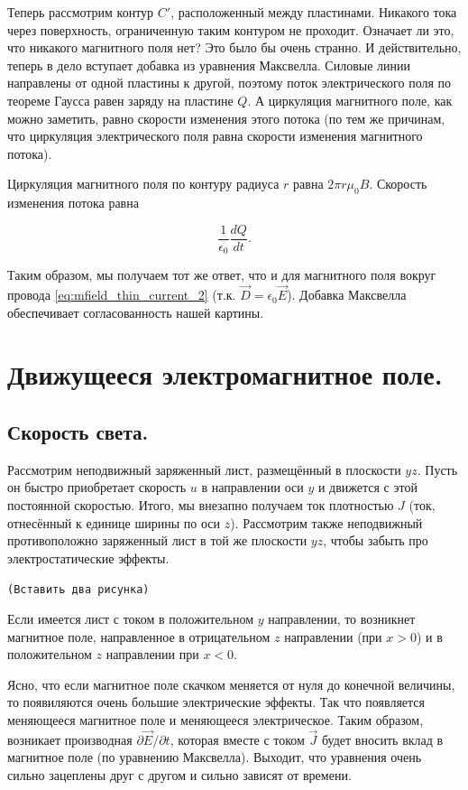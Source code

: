 \documentclass[11pt,a4paper]{article}
\numberwithin{equation}{section}
\newcommand{\pt}{\partial}
\newcommand{\eps}{\epsilon}
\newcommand{\com}[1]{{\Large{\texttt{{\color{red}(#1)}}}}}
\begin{document}
Теперь рассмотрим контур $C'$, расположенный между пластинами. Никакого
тока через поверхность, ограниченную таким контуром не
проходит. Означает ли это, что никакого магнитного поля нет? Это было
бы очень странно. И действительно, теперь в дело вступает добавка из
уравнения Максвелла. Силовые линии направлены от одной пластины к
другой, поэтому поток электрического поля по теореме Гаусса равен
заряду на пластине $Q$. А циркуляция магнитного поле, как можно
заметить, равно скорости изменения этого потока (по тем же причинам,
что циркуляция электрического поля равна скорости изменения магнитного
потока). 

Циркуляция магнитного поля по контуру радиуса $r$ равна $2\pi r
\mu_0 B$. Скорость изменения потока равна 

\begin{equation}
  \label{eq:phys_sense_maxwell_1}
  \frac{1}{\eps_0} \frac{dQ}{dt}.
\end{equation}

Таким образом, мы получаем тот же ответ, что и для магнитного поля
вокруг провода \eqref{eq:mfield_thin_current_2} (т.к. $\vec{D} =
\eps_0 \vec{E}$). Добавка Максвелла обеспечивает согласованность нашей
картины.

\section{Движущееся электромагнитное поле. }
\label{sec:moving_plate}

\subsection{Скорость света.}
\label{sec:speed_of_light}

Рассмотрим неподвижный заряженный лист, размещённый в плоскости
$yz$. Пусть он быстро приобретает скорость $u$ в направлении оси $y$ и
движется с этой постоянной скоростью. Итого, мы внезапно получаем ток
плотностью $J$ (ток, отнесённый к единице ширины по оси
$z$). Рассмотрим также неподвижный противоположно заряженный лист в
той же плоскости $yz$, чтобы забыть про электростатические эффекты.

\com{Вставить два рисунка}

Если имеется лист с током в положительном $y$ направлении, то
возникнет магнитное поле, направленное в отрицательном $z$
направлении (при $x>0$) и в положительном $z$ направлении при $x<0$. 

Ясно, что если магнитное поле скачком меняется от нуля до конечной
величины, то появиляются очень большие электрические эффекты. Так что
появляется меняющееся магнитное поле и меняющееся электрическое. Таким
образом, возникает производная $\pt \vec{E} / \pt t$, которая вместе с
током $\vec{J}$ будет вносить вклад в магнитное поле (по уравнению
Максвелла). Выходит, что уравнения очень сильно зацеплены друг с
другом и сильно зависят от времени. 
\end{document}
